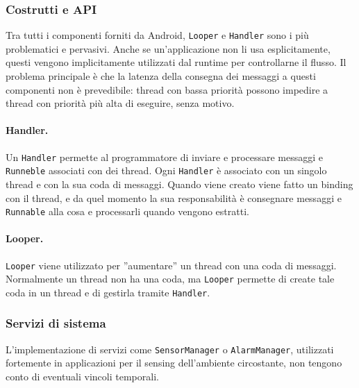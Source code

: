 \subsubsection{Costrutti e API}
Tra tutti i componenti forniti da Android, \texttt{Looper} e \texttt{Handler} sono i più problematici e pervasivi. Anche se un'applicazione non li usa esplicitamente, questi vengono implicitamente utilizzati dal runtime per controllarne il flusso. Il problema principale è che la latenza della consegna dei messaggi a questi componenti non è prevedibile: thread con bassa priorità possono impedire a thread con priorità più alta di eseguire, senza motivo. 

\paragraph{Handler.} Un \texttt{Handler} permette al programmatore di inviare e processare messaggi e \texttt{Runneble} associati con dei thread. Ogni \texttt{Handler} è associato con un singolo thread e con la sua coda di messaggi. Quando viene creato viene fatto un binding con il thread, e da quel momento la sua responsabilità è consegnare messaggi e \texttt{Runnable} alla cosa e processarli quando vengono estratti.

\paragraph{Looper.} \texttt{Looper} viene utilizzato per ''aumentare'' un thread con una coda di messaggi. Normalmente un thread non ha una coda, ma \texttt{Looper} permette di create tale coda in un thread e di gestirla tramite \texttt{Handler}.


\subsubsection{Servizi di sistema}
L'implementazione di servizi come \texttt{SensorManager} o \texttt{AlarmManager}, utilizzati fortemente in applicazioni per il sensing dell'ambiente circostante, non tengono conto di eventuali vincoli temporali.